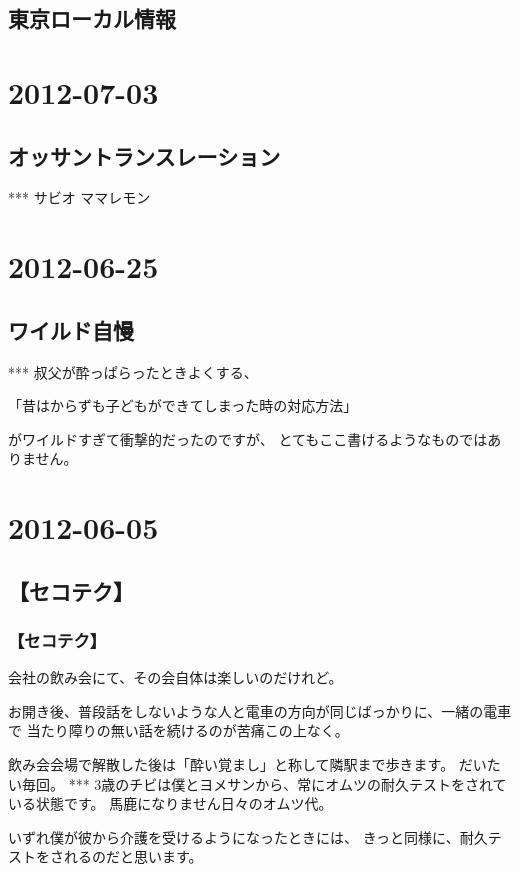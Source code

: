 \documentclass[11pt]{article}
\begin{document}
\subsection{東京ローカル情報}
\label{sec-6_1}
\section{2012-07-03}
\label{sec-7}
\subsection{オッサントランスレーション}
\label{sec-7_1}

***
サビオ
ママレモン
\section{2012-06-25}
\label{sec-8}
\subsection{ワイルド自慢}
\label{sec-8_1}

***
叔父が酔っぱらったときよくする、

「昔はからずも子どもができてしまった時の対応方法」

がワイルドすぎて衝撃的だったのですが、
とてもここ書けるようなものではありません。
\section{2012-06-05}
\label{sec-9}
\subsection{【セコテク】}
\label{sec-9_1}
\subsubsection{【セコテク】}
\label{sec-9_1_1}

会社の飲み会にて、その会自体は楽しいのだけれど。

お開き後、普段話をしないような人と電車の方向が同じばっかりに、一緒の電車で
当たり障りの無い話を続けるのが苦痛この上なく。

飲み会会場で解散した後は「酔い覚まし」と称して隣駅まで歩きます。
だいたい毎回。
***
3歳のチビは僕とヨメサンから、常にオムツの耐久テストをされている状態です。
馬鹿になりません日々のオムツ代。

いずれ僕が彼から介護を受けるようになったときには、
きっと同様に、耐久テストをされるのだと思います。
\end{document}
